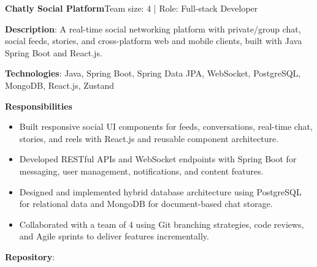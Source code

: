   \resumeProjectHeading
    {\textbf{Chatly Social Platform}}{Team size: 4 | Role: Full-stack Developer}
    \resumeItemListStart
      \item \textbf{Description}: A real-time social networking platform with private/group chat, social feeds, stories, and
        cross-platform web and mobile clients, built with Java Spring Boot and React.js.
      \item \textbf{Technologies}: Java, Spring Boot, Spring Data JPA, WebSocket, PostgreSQL, MongoDB, React.js, Zustand
      \item \textbf{Responsibilities}
        \begin{itemize}
          \item Built responsive social UI components for feeds, conversations, real-time chat, stories, and reels with React.js and reusable component architecture.
          \item Developed RESTful APIs and WebSocket endpoints with Spring Boot for messaging, user management, notifications, and content features.
          \item Designed and implemented hybrid database architecture using PostgreSQL for relational data and MongoDB for document-based chat storage.
          \item Collaborated with a team of 4 using Git branching strategies, code reviews, and Agile sprints to deliver features incrementally.
        \end{itemize}
      \item \textbf{Repository}: \href{https://github.com/nvminh162/chatly-social-platform}{}
    \resumeItemListEnd

